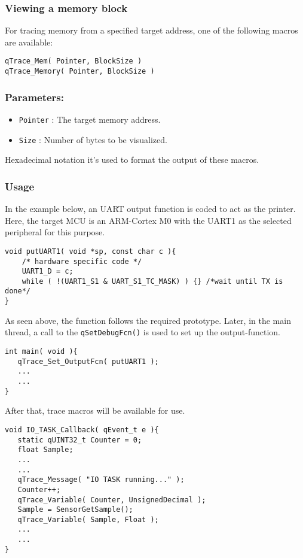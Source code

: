 \subsubsection{Viewing a memory block}
For tracing memory from a specified target address, one of the following macros are available:  

\begin{lstlisting}[style=CStyle]
qTrace_Mem( Pointer, BlockSize )
qTrace_Memory( Pointer, BlockSize )
\end{lstlisting}

\subsubsection*{Parameters:}
\begin{itemize}
    \item \lstinline{Pointer} : The target memory address.
    \item \lstinline{Size} : Number of bytes to be visualized.
\end{itemize}

Hexadecimal notation it's used to format the output of these macros.

\subsubsection{Usage}

In the example below, an UART output function is coded to act as the printer. Here, the target MCU is an ARM-Cortex M0 with the UART1 as the selected peripheral for this purpose. \\

\begin{lstlisting}[style=CStyle]
void putUART1( void *sp, const char c ){
    /* hardware specific code */
    UART1_D = c;
    while ( !(UART1_S1 & UART_S1_TC_MASK) ) {} /*wait until TX is done*/ 
}
\end{lstlisting}  

As seen above, the function follows the required prototype. Later, in the main thread, a call to the \lstinline{qSetDebugFcn()} is used to set up the output-function.

\begin{lstlisting}[style=CStyle]
int main( void ){
   qTrace_Set_OutputFcn( putUART1 );
   ... 
   ...
}
\end{lstlisting}  

After that, trace macros will be available for use.

\begin{lstlisting}[style=CStyle]
void IO_TASK_Callback( qEvent_t e ){
   static qUINT32_t Counter = 0;
   float Sample;
   ...
   ... 
   qTrace_Message( "IO TASK running..." );
   Counter++;
   qTrace_Variable( Counter, UnsignedDecimal );
   Sample = SensorGetSample();
   qTrace_Variable( Sample, Float );
   ...
   ...
}
\end{lstlisting}

\newpage